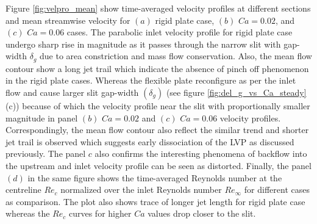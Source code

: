 \documentclass[final,3p,times,authoryear]{elsarticle}
\begin{document}
Figure \ref{fig:velpro_mean} show time-averaged velocity profiles at different sections and mean streamwise velocity for $(a)$ rigid plate case, $(b)$ $Ca=0.02$, and $(c)$ $Ca=0.06$ cases. The parabolic inlet velocity profile for rigid plate case undergo sharp rise in magnitude as it passes through the narrow slit with gap-width $\delta_g$ due to area constriction and mass flow conservation. Also, the mean flow contour show a long jet trail which indicate the absence of pinch off phenomenon in the rigid plate cases. Whereas the flexible plate reconfigure as per the inlet flow and cause larger slit gap-width $(\delta_g)$ (see figure \ref{fig:del_g_vs_Ca_steady}(c)) because of which the velocity profile near the slit with proportionally smaller magnitude in panel $(b)$ $Ca=0.02$ and $(c)$ $Ca=0.06$ velocity profiles. Correspondingly, the mean flow contour also reflect the similar trend and shorter jet trail is observed which suggests early dissociation of the LVP as discussed previously. The panel $c$ also confirms the interesting phenomena of backflow into the upstream and inlet velocity profile can be seen as distorted. Finally, the panel $(d)$ in the same figure shows the time-averaged Reynolds number at the centreline $Re_c$ normalized over the inlet Reynolds number $Re_\infty$ for different cases as comparison. The plot also shows trace of longer jet length for rigid plate case whereas the $Re_c$ curves for higher $Ca$ values drop closer to the slit.
	
\end{document}
